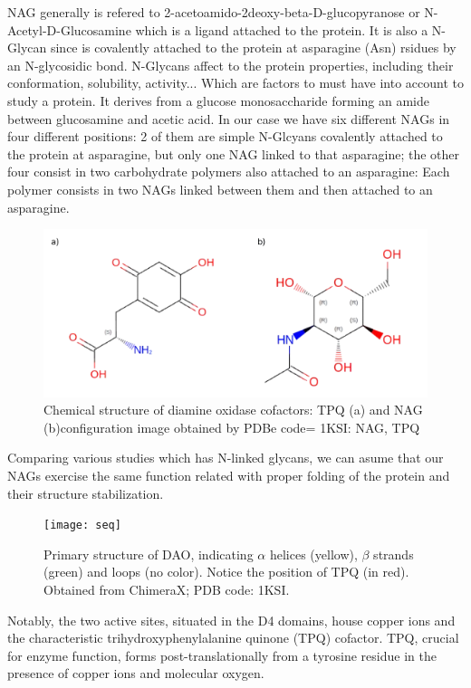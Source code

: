 \documentclass[a4paper]{article}
\begin{document}
NAG generally is refered to 2-acetoamido-2deoxy-beta-D-glucopyranose or N-Acetyl-D-Glucosamine which is a ligand attached to the protein. It is also a N-Glycan since is covalently attached to the protein at asparagine (Asn) rsidues by an N-glycosidic bond. N-Glycans affect to the protein properties, including their conformation, solubility, activity... Which are factors to must have into account to study a protein.
It derives from a glucose monosaccharide forming an amide between glucosamine and acetic acid.
In our case we have six different NAGs in four different positions: 2 of them are simple N-Glcyans covalently attached to the protein at asparagine, but only one NAG linked to that asparagine; the other four consist in two carbohydrate polymers also attached to an asparagine: Each polymer consists in two NAGs linked between them and then attached to an asparagine\cite{Tekin2023}.

\begin{figure}[h]
    \centering
    \includegraphics[width = 0.8\hsize]{./figures/nagtpq}
    \caption{Chemical structure of diamine oxidase cofactors: TPQ (a) and NAG (b)configuration image obtained by PDBe code= 1KSI: NAG, TPQ}
    \label{fig:NAGTPQ}
\end{figure}

Comparing various studies which has N-linked glycans, we can asume that our NAGs exercise the same function related with proper folding of the protein and their structure stabilization.

\begin{figure}[h]
    \centering
    \texttt{[image: seq]}
    \caption{Primary structure of DAO, indicating $\alpha$ helices (yellow), $\beta$ strands (green) and loops (no color). Notice the position of TPQ (in red). Obtained from ChimeraX; PDB code: 1KSI.}
\label{fig:seq}
\end{figure}

Notably, the two active sites, situated in the D4 domains, house copper ions and the characteristic trihydroxyphenylalanine quinone (TPQ) cofactor. TPQ, crucial for enzyme function, forms post-translationally from a tyrosine residue in the presence of copper ions and molecular oxygen.
\end{document}
